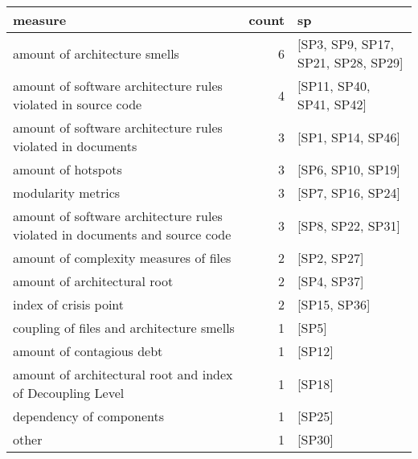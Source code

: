 \begin{tabular}{lrl}
\toprule
                                                                     measure &  count &                                  sp \\
\midrule
                                               amount of architecture smells &      6 &  [SP3, SP9, SP17, SP21, SP28, SP29] \\
               amount of software architecture rules violated in source code &      4 &            [SP11, SP40, SP41, SP42] \\
                 amount of software architecture rules violated in documents &      3 &                   [SP1, SP14, SP46] \\
                                                          amount of hotspots &      3 &                   [SP6, SP10, SP19] \\
                                                          modularity metrics &      3 &                   [SP7, SP16, SP24] \\
 amount of software architecture rules violated in documents and source code &      3 &                   [SP8, SP22, SP31] \\
                                      amount of complexity measures of files &      2 &                         [SP2, SP27] \\
                                                amount of architectural root &      2 &                         [SP4, SP37] \\
                                                       index of crisis point &      2 &                        [SP15, SP36] \\
                                   coupling of files and architecture smells &      1 &                               [SP5] \\
                                                   amount of contagious debt &      1 &                              [SP12] \\
                  amount of architectural root and index of Decoupling Level &      1 &                              [SP18] \\
                                                    dependency of components &      1 &                              [SP25] \\
                                                                       other &      1 &                              [SP30] \\
\bottomrule
\end{tabular}
